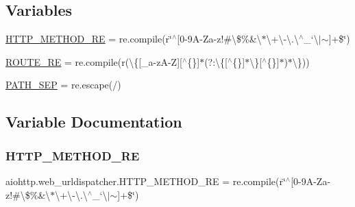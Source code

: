 \subsection*{Variables}
\begin{DoxyCompactItemize}
\item 
\hyperlink{namespaceaiohttp_1_1web__urldispatcher_a039b77152a24518dbc91d0f710b30262}{H\+T\+T\+P\+\_\+\+M\+E\+T\+H\+O\+D\+\_\+\+RE} = re.\+compile(r\char`\"{}$^\wedge$\mbox{[}0-\/9\+A-\/\+Za-\/z!\#\textbackslash{}\$\%\&\textquotesingle{}\textbackslash{}$\ast$\textbackslash{}+\textbackslash{}-\/\textbackslash{}.\textbackslash{}$^\wedge$\+\_\+`\textbackslash{}$\vert$$\sim$\mbox{]}+\$\char`\"{})
\item 
\hyperlink{namespaceaiohttp_1_1web__urldispatcher_adc3ed650e619736128775c3d60ea7730}{R\+O\+U\+T\+E\+\_\+\+RE} = re.\+compile(r\textquotesingle{}(\textbackslash{}\{\mbox{[}\+\_\+a-\/zA-\/Z\mbox{]}\mbox{[}$^\wedge$\{\}\mbox{]}$\ast$(?\+:\textbackslash{}\{\mbox{[}$^\wedge$\{\}\mbox{]}$\ast$\textbackslash{}\}\mbox{[}$^\wedge$\{\}\mbox{]}$\ast$)$\ast$\textbackslash{}\})\textquotesingle{})
\item 
\hyperlink{namespaceaiohttp_1_1web__urldispatcher_a8e6301c2d8abb3c89df1af3741eeae54}{P\+A\+T\+H\+\_\+\+S\+EP} = re.\+escape(\textquotesingle{}/\textquotesingle{})
\end{DoxyCompactItemize}


\subsection{Variable Documentation}
\mbox{\label{namespaceaiohttp_1_1web__urldispatcher_a039b77152a24518dbc91d0f710b30262}} 
\subsubsection{\texorpdfstring{H\+T\+T\+P\+\_\+\+M\+E\+T\+H\+O\+D\+\_\+\+RE}{HTTP\_METHOD\_RE}}
{\footnotesize\ttfamily aiohttp.\+web\+\_\+urldispatcher.\+H\+T\+T\+P\+\_\+\+M\+E\+T\+H\+O\+D\+\_\+\+RE = re.\+compile(r\char`\"{}$^\wedge$\mbox{[}0-\/9\+A-\/\+Za-\/z!\#\textbackslash{}\$\%\&\textquotesingle{}\textbackslash{}$\ast$\textbackslash{}+\textbackslash{}-\/\textbackslash{}.\textbackslash{}$^\wedge$\+\_\+`\textbackslash{}$\vert$$\sim$\mbox{]}+\$\char`\"{})}

